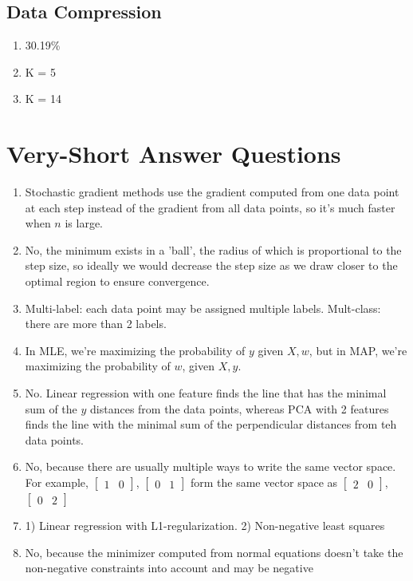 \documentclass{article}
\def\enum#1{\begin{enumerate}#1\end{enumerate}}
\begin{document}
\vspace{10em}
\subsection{Data Compression}

\enum{
\item 30.19\% 
\item K = 5
\item K = 14
}


\section{Very-Short Answer Questions}


\enum{
\item Stochastic gradient methods use the gradient computed from one data point at each step instead of the gradient from all data points, so it's much faster when $n$ is large.
\item No, the minimum exists in a 'ball', the radius of which is proportional to the step size, so ideally we would decrease the step size as we draw closer to the optimal region to ensure convergence.
\item Multi-label: each data point may be assigned multiple labels. Mult-class: there are more than 2 labels.
\item In MLE, we're maximizing the probability of $y$ given $X, w$, but in MAP, we're maximizing the probability of $w$, given $X, y$.
\item No. Linear regression with one feature finds the line that has the minimal sum of the $y$ distances from the data points, whereas PCA with 2 features finds the line with the minimal sum of the perpendicular distances from teh data points.
\item No, because there are usually multiple ways to write the same vector space. For example, $\begin{bmatrix}1 & 0\end{bmatrix}$, $\begin{bmatrix}0 & 1\end{bmatrix}$ form the same vector space as $\begin{bmatrix}2 & 0\end{bmatrix}$, $\begin{bmatrix}0 & 2\end{bmatrix}$
\item 1) Linear regression with L1-regularization. 2) Non-negative least squares
\item No, because the minimizer computed from normal equations doesn't take the non-negative constraints into account and may be negative
}
\end{document}
